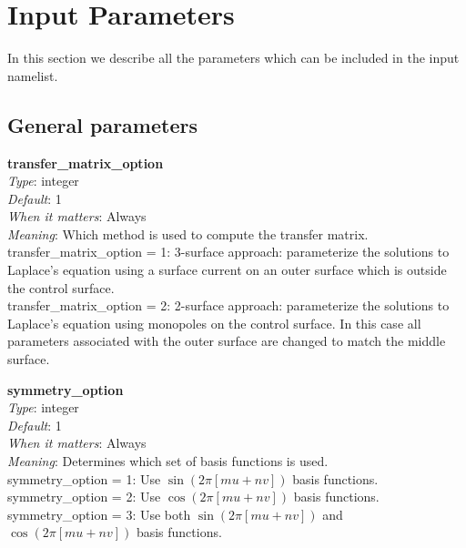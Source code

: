 \chapter{Input Parameters}
\label{ch:input}

\newcommand{\param}[5]{{\setlength{\parindent}{0cm} {\ttfamily \bfseries \hypertarget{#1}{#1}}\\{\it Type}: #2\\{\it Default}: #3\\{\it When it matters}: #4\\{\it Meaning}: #5}}
\newcommand{\myhrule}{{\setlength{\parindent}{0cm} \hrulefill }}

\newcommand{\true}{{\ttfamily .true.}}
\newcommand{\false}{{\ttfamily .false.}}

In this section we describe all the parameters which can be included in the input namelist. 

\section{General parameters}

\param{transfer\_matrix\_option}
{integer}
{1}
{Always}
{Which method is used to compute the transfer matrix.\\

{\ttfamily transfer\_matrix\_option} = 1: 3-surface approach: parameterize the solutions to Laplace's equation using a surface current on an outer surface
which is outside the control surface.\\

{\ttfamily transfer\_matrix\_option} = 2: 2-surface approach: parameterize the solutions to Laplace's equation using monopoles on the control surface. In this case
all parameters associated with the outer surface are changed to match the middle surface.
}

\myhrule

\param{symmetry\_option}
{integer}
{1}
{Always}
{Determines which set of basis functions is used.\\

{\ttfamily symmetry\_option} = 1: Use $\sin(2 \pi [mu+nv])$ basis functions.\\

{\ttfamily symmetry\_option} = 2: Use $\cos(2 \pi [mu+nv])$ basis functions.\\

{\ttfamily symmetry\_option} = 3: Use both $\sin(2 \pi [mu+nv])$ and $\cos(2 \pi [mu+nv])$ basis functions.
}


